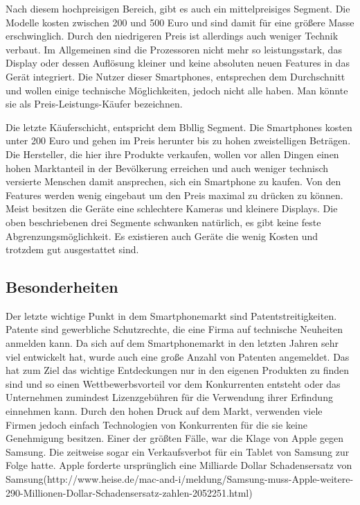 Nach diesem hochpreisigen Bereich, gibt es auch ein mittelpreisiges Segment. Die Modelle kosten zwischen 200  und 500 Euro und  sind damit für eine größere Masse erschwinglich. Durch den niedrigeren Preis ist allerdings auch weniger Technik verbaut. Im Allgemeinen sind die Prozessoren nicht mehr so leistungsstark, das Display oder dessen Auflösung kleiner und keine absoluten neuen Features in das Gerät integriert. Die Nutzer dieser Smartphones, entsprechen dem Durchschnitt und wollen einige technische Möglichkeiten, jedoch nicht alle haben. Man könnte sie als Preis-Leistungs-Käufer bezeichnen.

Die letzte Käuferschicht, entspricht dem Bbllig Segment. Die Smartphones kosten unter 200 Euro und gehen im Preis herunter  bis zu hohen zweistelligen Beträgen. Die Hersteller, die hier ihre Produkte verkaufen, wollen vor allen Dingen einen hohen Marktanteil in der Bevölkerung erreichen und auch weniger technisch versierte Menschen damit ansprechen, sich ein Smartphone zu kaufen. Von den Features werden wenig eingebaut um den Preis maximal zu drücken zu können. Meist besitzen die Geräte eine schlechtere Kameras  und kleinere Displays.
Die oben beschriebenen drei Segmente schwanken natürlich, es gibt keine feste Abgrenzungsmöglichkeit. Es existieren auch Geräte die wenig Kosten und trotzdem gut ausgestattet sind.



\subsection{Besonderheiten}
Der letzte wichtige Punkt in dem Smartphonemarkt sind Patentstreitigkeiten. Patente sind gewerbliche Schutzrechte, die eine Firma auf technische Neuheiten anmelden kann. Da sich auf dem Smartphonemarkt in den letzten Jahren sehr viel entwickelt hat, wurde auch eine große Anzahl von Patenten angemeldet. Das hat zum Ziel das wichtige Entdeckungen nur in den eigenen Produkten zu finden sind und so einen Wettbewerbsvorteil vor dem Konkurrenten entsteht oder das Unternehmen zumindest Lizenzgebühren für die Verwendung ihrer Erfindung einnehmen kann.  Durch den hohen Druck auf dem Markt, verwenden viele Firmen jedoch einfach Technologien von Konkurrenten für die sie keine Genehmigung besitzen. Einer der größten Fälle, war die Klage von Apple gegen Samsung. Die zeitweise sogar ein Verkaufsverbot für ein Tablet von Samsung zur Folge hatte. Apple forderte ursprünglich eine Milliarde Dollar Schadensersatz von Samsung(http://www.heise.de/mac-and-i/meldung/Samsung-muss-Apple-weitere-290-Millionen-Dollar-Schadensersatz-zahlen-2052251.html)

